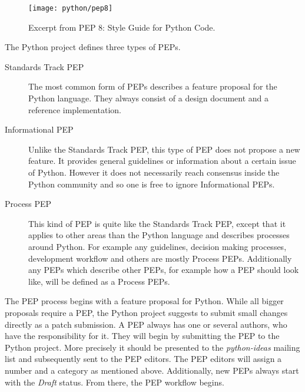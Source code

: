 \begin{figure}[htbp]
  \centering
  \texttt{[image: python/pep8]}
  \caption[Excerpt from \acl{PEP} 8]{Excerpt from \ac{PEP} 8: Style Guide for Python Code.}
\end{figure}

The Python project defines three types of \acp{PEP}.

\begin{description}

  \item[Standards Track PEP] The most common form of \acp{PEP} describes a
    feature proposal for the Python language. They always consist of a design
    document and a reference implementation.

  \item[Informational PEP] Unlike the Standards Track PEP, this type of
    \ac{PEP} does not propose a new feature. It provides general guidelines or
    information about a certain issue of Python. However it does not
    necessarily reach consensus inside the Python community and so one is free
    to ignore Informational PEPs.

  \item[Process PEP] This kind of \ac{PEP} is quite like the Standards Track
    PEP, except that it applies to other areas than the Python language and
    describes processes around Python. For example any guidelines, decision
    making processes, development workflow and others are mostly Process PEPs.
    Additionally any \acp{PEP} which describe other \acp{PEP}, for example how
    a \ac{PEP} should look like, will be defined as a Process PEPs.

\end{description}

The \ac{PEP} process begins with a feature proposal for Python. While all
bigger proposals require a \ac{PEP}, the Python project suggests to submit
small changes directly as a patch submission. A \ac{PEP} always has one or
several authors, who have the responsibility for it. They will begin by
submitting the \ac{PEP} to the Python project. More precisely it should be
presented to the \emph{python-ideas} mailing list and subsequently sent to the
\ac{PEP} editors. The \ac{PEP} editors will assign a number and a category as
mentioned above. Additionally, new \acp{PEP} always start with the \emph{Draft}
status. From there, the \ac{PEP} workflow begins.

